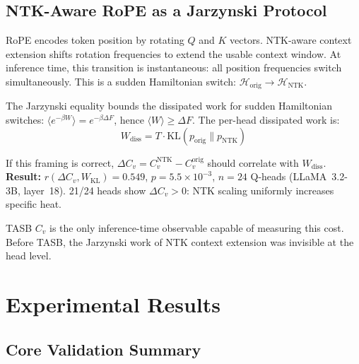 \documentclass[11pt,a4paper]{article}
\begin{document}
\subsection{NTK-Aware RoPE as a Jarzynski Protocol}

RoPE encodes token position by rotating $Q$ and $K$ vectors. NTK-aware context
extension \citep{bloc97_ntk2023} shifts rotation frequencies to extend the usable
context window. At inference time, this transition is instantaneous: all position
frequencies switch simultaneously. This is a sudden Hamiltonian switch:
$\mathcal{H}_\mathrm{orig} \to \mathcal{H}_\mathrm{NTK}$.

The Jarzynski equality \citep{jarzynski1997nonequilibrium} bounds the dissipated
work for sudden Hamiltonian switches: $\langle e^{-\beta W} \rangle =
e^{-\beta \Delta F}$, hence $\langle W \rangle \geq \Delta F$. The per-head
dissipated work is:
\begin{equation}
  W_\mathrm{diss} = T \cdot \mathrm{KL}(p_\mathrm{orig} \| p_\mathrm{NTK})
\end{equation}

If this framing is correct, $\Delta C_v = C_v^\mathrm{NTK} - C_v^\mathrm{orig}$
should correlate with $W_\mathrm{diss}$. \textbf{Result:} $r(\Delta C_v,
W_\mathrm{KL}) = 0.549$, $p = 5.5 \times 10^{-3}$, $n = 24$ Q-heads
(LLaMA~3.2-3B, layer~18). 21/24 heads show $\Delta C_v > 0$: NTK scaling
uniformly increases specific heat.

TASB $C_v$ is the only inference-time observable capable of measuring this cost.
Before TASB, the Jarzynski work of NTK context extension was invisible at the
head level.

\section{Experimental Results}
\label{sec:experiments}

\subsection{Core Validation Summary}
\end{document}
